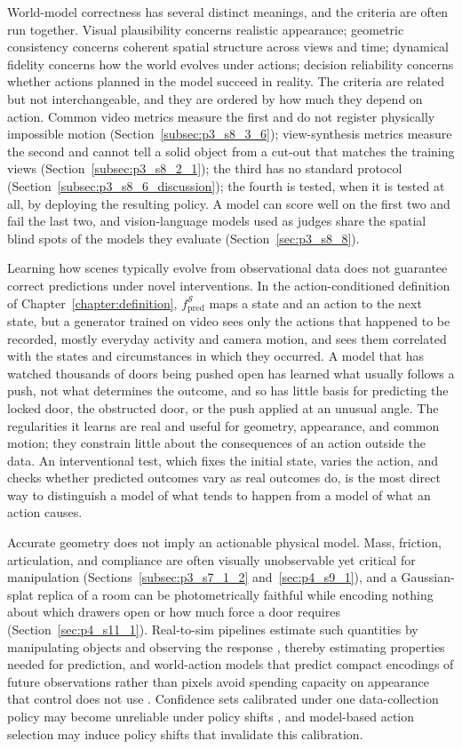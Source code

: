 World-model correctness has several distinct meanings, and the criteria are often run together.
Visual plausibility concerns realistic appearance; geometric consistency concerns coherent spatial structure across views and time; dynamical fidelity concerns how the world evolves under actions; decision reliability concerns whether actions planned in the model succeed in reality.
The criteria are related but not interchangeable, and they are ordered by how much they depend on action.
Common video metrics measure the first and do not register physically impossible motion (Section~\ref{subsec:p3_s8_3_6}); view-synthesis metrics measure the second and cannot tell a solid object from a cut-out that matches the training views (Section~\ref{subsec:p3_s8_2_1}); the third has no standard protocol (Section~\ref{subsec:p3_s8_6_discussion}); the fourth is tested, when it is tested at all, by deploying the resulting policy.
A model can score well on the first two and fail the last two, and vision-language models used as judges share the spatial blind spots of the models they evaluate (Section~\ref{sec:p3_s8_8}).

Learning how scenes typically evolve from observational data does not guarantee correct predictions under novel interventions.
In the action-conditioned definition of Chapter~\ref{chapter:definition}, $f^{\mathcal{S}}_{\text{pred}}$ maps a state and an action to the next state, but a generator trained on video sees only the actions that happened to be recorded, mostly everyday activity and camera motion, and sees them correlated with the states and circumstances in which they occurred.
A model that has watched thousands of doors being pushed open has learned what usually follows a push, not what determines the outcome, and so has little basis for predicting the locked door, the obstructed door, or the push applied at an unusual angle.
The regularities it learns are real and useful for geometry, appearance, and common motion; they constrain little about the consequences of an action outside the data.
An interventional test, which fixes the initial state, varies the action, and checks whether predicted outcomes vary as real outcomes do, is the most direct way to distinguish a model of what tends to happen from a model of what an action causes.

Accurate geometry does not imply an actionable physical model.
Mass, friction, articulation, and compliance are often visually unobservable yet critical for manipulation (Sections~\ref{subsec:p3_s7_1_2} and~\ref{sec:p4_s9_1}), and a Gaussian-splat replica of a room can be photometrically faithful while encoding nothing about which drawers open or how much force a door requires (Section~\ref{sec:p4_s11_1}).
Real-to-sim pipelines estimate such quantities by manipulating objects and observing the response \cite{pfaff2025scalable}, thereby estimating properties needed for prediction, and world-action models that predict compact encodings of future observations rather than pixels avoid spending capacity on appearance that control does not use \cite{yu2026jam}.
Confidence sets calibrated under one data-collection policy may become unreliable under policy shifts \cite{mittal2026calibrated}, and model-based action selection may induce policy shifts that invalidate this calibration.

